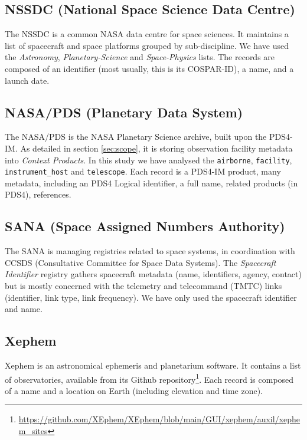\documentclass[11pt,a4paper]{ivoa}
\begin{document}
\subsection{NSSDC (National Space Science Data Centre)}
The NSSDC is a common NASA data centre for space sciences. It maintains
a list of 
spacecraft and space platforms grouped by sub-discipline.
We have used the \emph{Astronomy}, \emph{Planetary-Science} and 
\emph{Space-Physics} lists. The records are composed of an 
identifier (most usually, this is its COSPAR-ID), a name, and a
launch date.

\subsection{NASA/PDS (Planetary Data System)}
The NASA/PDS is the NASA Planetary Science archive, built upon the 
PDS4-IM. As detailed in section \ref{sec:scope}, it is storing 
observation facility metadata into \emph{Context Products}. In this 
study we have analysed the \texttt{airborne}, \texttt{facility},  
\texttt{instrument\_host} and \texttt{telescope}. Each record is 
a PDS4-IM product, many metadata, including an PDS4 Logical 
identifier, a full name, related products (in PDS4), references.

\subsection{SANA (Space Assigned Numbers Authority)}
The SANA is managing registries related to space systems, in 
coordination with CCSDS (Consultative Committee for Space Data
Systems). The \emph{Spacecraft Identifier} registry gathers 
spacecraft metadata (name, identifiers, agency, contact) but is 
mostly concerned with the telemetry and telecommand (TMTC) links 
(identifier, link type, link frequency). We have only used the 
spacecraft identifier and name.  

\subsection{Xephem}
Xephem is an astronomical ephemeris and planetarium software. It
contains a list of observatories, available from its Github 
repository\footnote{\url{https://github.com/XEphem/XEphem/blob/main/GUI/xephem/auxil/xephem_sites}}.
Each record is composed of a name and a location on Earth 
(including elevation and time zone).
  
\end{document}
